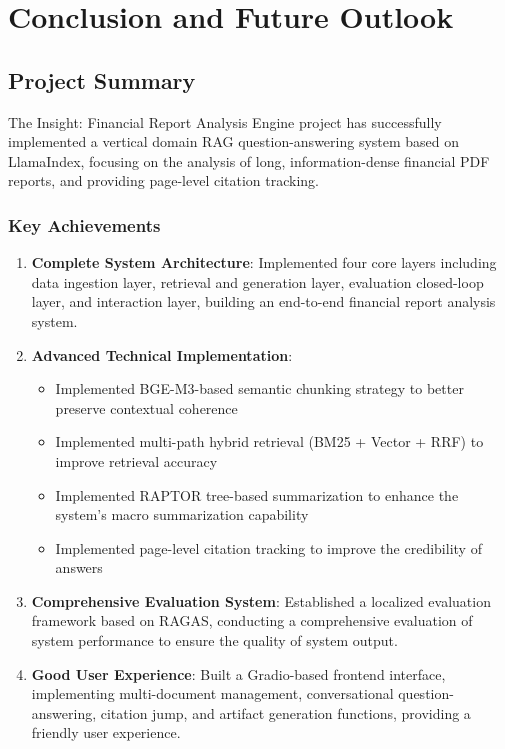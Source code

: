 \section{Conclusion and Future Outlook}

\subsection{Project Summary}

The Insight: Financial Report Analysis Engine project has successfully implemented a vertical domain RAG question-answering system based on LlamaIndex, focusing on the analysis of long, information-dense financial PDF reports, and providing page-level citation tracking.

\subsubsection{Key Achievements}

\begin{enumerate}
\item \textbf{Complete System Architecture}: Implemented four core layers including data ingestion layer, retrieval and generation layer, evaluation closed-loop layer, and interaction layer, building an end-to-end financial report analysis system.

\item \textbf{Advanced Technical Implementation}:
   \begin{itemize}
   \item Implemented BGE-M3-based semantic chunking strategy to better preserve contextual coherence
   \item Implemented multi-path hybrid retrieval (BM25 + Vector + RRF) to improve retrieval accuracy
   \item Implemented RAPTOR tree-based summarization to enhance the system's macro summarization capability
   \item Implemented page-level citation tracking to improve the credibility of answers
   \end{itemize}

\item \textbf{Comprehensive Evaluation System}: Established a localized evaluation framework based on RAGAS, conducting a comprehensive evaluation of system performance to ensure the quality of system output.

\item \textbf{Good User Experience}: Built a Gradio-based frontend interface, implementing multi-document management, conversational question-answering, citation jump, and artifact generation functions, providing a friendly user experience.
\end{enumerate}

